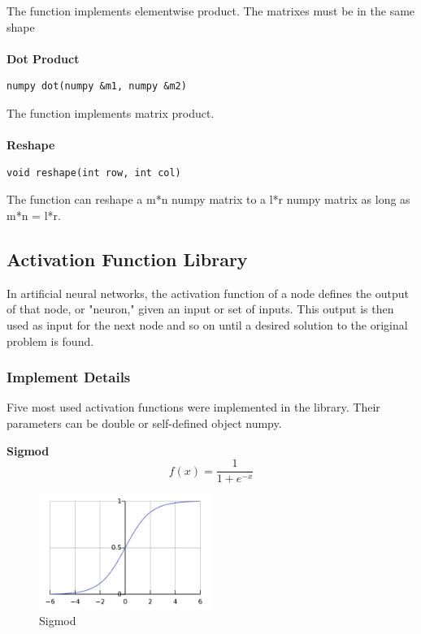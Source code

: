 \documentclass[letterpaper]{article}
\begin{document}
The function implements elementwise product. The matrixes must be in the same shape\\\\
\textbf{\Large Dot Product}\\
\begin{lstlisting}[language={[ANSI]C++},keywordstyle=\color{blue!70},commentstyle=\color{red!50!green!50!blue!50},frame=shadowbox, rulesepcolor=\color{red!20!green!20!blue!20}]
numpy dot(numpy &m1, numpy &m2)
\end{lstlisting}

The function implements matrix product. \\\\
\textbf{\Large Reshape}\\
\begin{lstlisting}[language={[ANSI]C++},keywordstyle=\color{blue!70},commentstyle=\color{red!50!green!50!blue!50},frame=shadowbox, rulesepcolor=\color{red!20!green!20!blue!20}]
void reshape(int row, int col)
\end{lstlisting}

The function can reshape a m*n numpy matrix to a l*r numpy matrix as long as m*n = l*r.\\

\subsection{Activation Function Library}
In artificial neural networks, the activation function of a node defines the output of that node, or "neuron," given an input or set of inputs. This output is then used as input for the next node and so on until a desired solution to the original problem is found\cite{nano1}.
\subsubsection{Implement Details}
Five most used activation functions were implemented in the library. Their parameters can be double or self-defined object numpy.

\textbf{Sigmod}
$$f(x)=\frac{1}{1+e^{-x}}$$
\begin{figure}[H]
\centering
\includegraphics[width=0.5\textwidth]{sigmod.png}
\caption{\label{fig:frog}Sigmod}
\end{figure}
\end{document}
